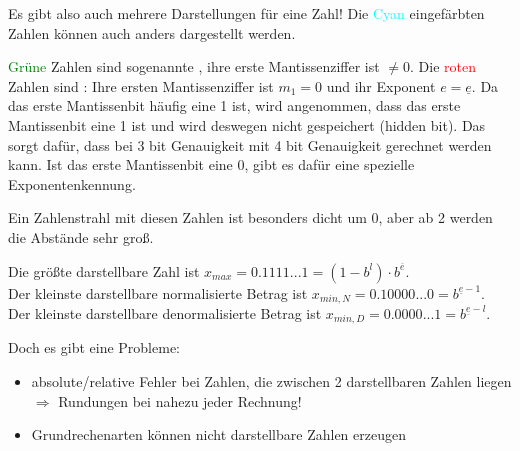 Es gibt also auch mehrere Darstellungen für eine Zahl! Die \textcolor{Cyan}{Cyan} eingefärbten Zahlen können auch anders dargestellt werden. 

\textcolor{Green}{Grüne} Zahlen sind sogenannte , ihre erste Mantissenziffer ist $\neq 0$. Die \textcolor{red}{roten} Zahlen sind : Ihre ersten Mantissenziffer ist $m_1=0$ und ihr Exponent $e=\underline{e}$. Da das erste Mantissenbit häufig eine 1 ist, wird angenommen, dass das erste Mantissenbit eine 1 ist und wird deswegen nicht gespeichert (hidden bit). Das sorgt dafür, dass bei 3 bit Genauigkeit mit 4 bit Genauigkeit gerechnet werden kann. Ist das erste Mantissenbit eine 0, gibt es dafür eine spezielle Exponentenkennung.

Ein Zahlenstrahl mit diesen Zahlen ist besonders dicht um 0, aber ab 2 werden die Abstände sehr groß.

Die größte darstellbare Zahl ist $x_{max}=0.1111...1=(1-b^l)\cdot b^{\overline{e}}$. \\
Der kleinste darstellbare normalisierte Betrag ist $x_{min,N} = 0.10000...0=b^{\underline{e}-1}$. \\
Der kleinste darstellbare denormalisierte Betrag ist $x_{min,D} = 0.0000...1=b^{\underline{e}-l}$.

Doch es gibt eine Probleme:
\begin{itemize}
	\item absolute/relative Fehler bei Zahlen, die zwischen 2 darstellbaren Zahlen liegen $\Rightarrow$ Rundungen bei nahezu jeder Rechnung!
	\item Grundrechenarten können nicht darstellbare Zahlen erzeugen
\end{itemize}